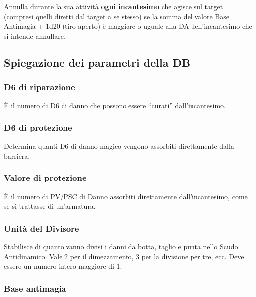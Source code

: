 Annulla durante la sua attivit\`a \textbf{ogni incantesimo} che
agisce sul target (compresi quelli diretti dal target a se stesso) se
la somma del valore Base Antimagia + 1d20 (tiro aperto) \`e maggiore
o uguale alla DA dell'incantesimo che si intende annullare. 




{\raggedright \subsection{Spiegazione dei parametri della DB}}

\subsubsection{D6 di riparazione} 
\`E il numero di D6 di danno che possono essere ``curati''
dall'incantesimo.

\subsubsection{D6 di protezione} 
Determina
quanti D6 di danno magico vengono assorbiti direttamente dalla
barriera.

\subsubsection{Valore di protezione}

\`E il numero di PV/PSC di Danno assorbiti direttamente
dall'incantesimo, come se si trattasse di un'armatura.

\subsubsection{Unit\`a del Divisore}
Stabilisce di quanto vanno divisi i danni da botta, taglio e punta
nello Scudo Antidinamico.  Vale 2 per il dimezzamento, 3 per la
divisione per tre, ecc. Deve essere un numero intero maggiore di 1.

\subsubsection{Base antimagia} 

